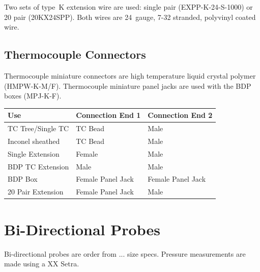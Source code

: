 \documentclass[11pt,oneside]{book}
\begin{document}
Two sets of type~K extension wire are used: single pair (EXPP-K-24-S-1000) or 20 pair (20KX24SPP). Both wires are 24~gauge, 7-32 stranded, polyvinyl coated wire.

\section{Thermocouple Connectors}

Thermocouple miniature connectors are high temperature liquid crystal polymer (HMPW-K-M/F). Thermocouple miniature panel jacks are used with the BDP boxes (MPJ-K-F).

\begin{table}[h!]
\centering
{}\label{tab:TC_connect}
\begin{tabular}{lll}
\toprule[1.5pt]
Use                & Connection End 1   & Connection End 2    \\
\midrule
TC Tree/Single TC  & TC Bead            &  Male               \\ 
Inconel sheathed   & TC Bead            &  Male               \\
Single Extension   & Female             &  Male               \\
BDP TC Extension   & Male               &  Male               \\
BDP Box            & Female Panel Jack  &  Female Panel Jack  \\
20 Pair Extension  & Female Panel Jack  &  Male               \\
\bottomrule[1.25pt]
\end{tabular}\par
\end{table}



\chapter{Bi-Directional Probes}
\label{chap:bdp}

Bi-directional probes are order from ... size specs. Pressure measurements are made using a XX Setra.
\end{document}
